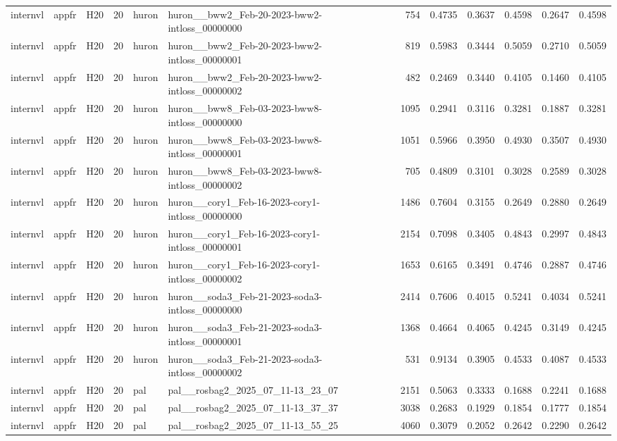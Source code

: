 \begin{table}[tbp]
\begin{tabular}{lllrllrrrrrr}
internvl & appfr & H20 & 20 & huron & huron\_\_bww2\_Feb-20-2023-bww2-intloss\_00000000 & 754 & 0.4735 & 0.3637 & 0.4598 & 0.2647 & 0.4598 \\
internvl & appfr & H20 & 20 & huron & huron\_\_bww2\_Feb-20-2023-bww2-intloss\_00000001 & 819 & 0.5983 & 0.3444 & 0.5059 & 0.2710 & 0.5059 \\
internvl & appfr & H20 & 20 & huron & huron\_\_bww2\_Feb-20-2023-bww2-intloss\_00000002 & 482 & 0.2469 & 0.3440 & 0.4105 & 0.1460 & 0.4105 \\
internvl & appfr & H20 & 20 & huron & huron\_\_bww8\_Feb-03-2023-bww8-intloss\_00000000 & 1095 & 0.2941 & 0.3116 & 0.3281 & 0.1887 & 0.3281 \\
internvl & appfr & H20 & 20 & huron & huron\_\_bww8\_Feb-03-2023-bww8-intloss\_00000001 & 1051 & 0.5966 & 0.3950 & 0.4930 & 0.3507 & 0.4930 \\
internvl & appfr & H20 & 20 & huron & huron\_\_bww8\_Feb-03-2023-bww8-intloss\_00000002 & 705 & 0.4809 & 0.3101 & 0.3028 & 0.2589 & 0.3028 \\
internvl & appfr & H20 & 20 & huron & huron\_\_cory1\_Feb-16-2023-cory1-intloss\_00000000 & 1486 & 0.7604 & 0.3155 & 0.2649 & 0.2880 & 0.2649 \\
internvl & appfr & H20 & 20 & huron & huron\_\_cory1\_Feb-16-2023-cory1-intloss\_00000001 & 2154 & 0.7098 & 0.3405 & 0.4843 & 0.2997 & 0.4843 \\
internvl & appfr & H20 & 20 & huron & huron\_\_cory1\_Feb-16-2023-cory1-intloss\_00000002 & 1653 & 0.6165 & 0.3491 & 0.4746 & 0.2887 & 0.4746 \\
internvl & appfr & H20 & 20 & huron & huron\_\_soda3\_Feb-21-2023-soda3-intloss\_00000000 & 2414 & 0.7606 & 0.4015 & 0.5241 & 0.4034 & 0.5241 \\
internvl & appfr & H20 & 20 & huron & huron\_\_soda3\_Feb-21-2023-soda3-intloss\_00000001 & 1368 & 0.4664 & 0.4065 & 0.4245 & 0.3149 & 0.4245 \\
internvl & appfr & H20 & 20 & huron & huron\_\_soda3\_Feb-21-2023-soda3-intloss\_00000002 & 531 & 0.9134 & 0.3905 & 0.4533 & 0.4087 & 0.4533 \\
internvl & appfr & H20 & 20 & pal & pal\_\_rosbag2\_2025\_07\_11-13\_23\_07 & 2151 & 0.5063 & 0.3333 & 0.1688 & 0.2241 & 0.1688 \\
internvl & appfr & H20 & 20 & pal & pal\_\_rosbag2\_2025\_07\_11-13\_37\_37 & 3038 & 0.2683 & 0.1929 & 0.1854 & 0.1777 & 0.1854 \\
internvl & appfr & H20 & 20 & pal & pal\_\_rosbag2\_2025\_07\_11-13\_55\_25 & 4060 & 0.3079 & 0.2052 & 0.2642 & 0.2290 & 0.2642 \\

\end{tabular}
\end{table}
